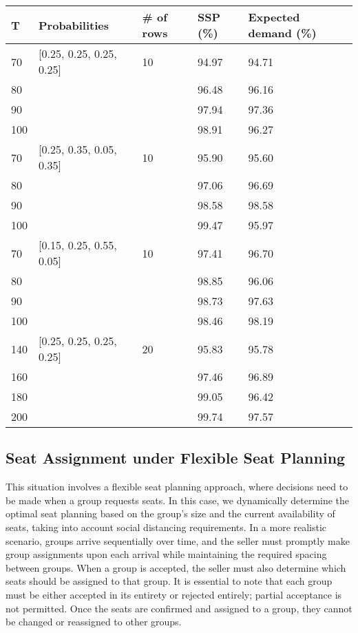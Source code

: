 \begin{table}[ht]
  \centering
  \begin{tabular}{|l|l|l|l|l|}
  \hline
   T & Probabilities & \# of rows & SSP (\%) & Expected demand (\%) \\
  \hline
  70  & [0.25, 0.25, 0.25, 0.25]  & 10 & 94.97 & 94.71  \\
  80  &   &  & 96.48 & 96.16  \\
  90  &   &  & 97.94 & 97.36  \\
  100  &   &  & 98.91 & 96.27  \\
  \hline
  70  & [0.25, 0.35, 0.05, 0.35]  & 10 & 95.90 & 95.60 \\
  80  &   &  & 97.06 & 96.69 \\
  90  &   &  & 98.58 & 98.58 \\
  100  &   &  & 99.47 & 95.97 \\
  \hline
  70  & [0.15, 0.25, 0.55, 0.05]  & 10 & 97.41 & 96.70 \\
  80  &   &  & 98.85 & 96.06 \\
  90  &   &  & 98.73 & 97.63 \\
  100  &   &  & 98.46 & 98.19 \\
  \hline
  140  & [0.25, 0.25, 0.25, 0.25]  & 20 & 95.83 & 95.78 \\
  160  &   &  & 97.46 & 96.89 \\
  180  &   &  & 99.05 & 96.42 \\
  200  &   &  & 99.74 & 97.57 \\
  \hline
  \end{tabular}
\end{table}

\subsection{Seat Assignment under Flexible Seat Planning}\label{sec_dynamic_seat}
This situation involves a flexible seat planning approach, where decisions need to be made when a group requests seats. In this case, we dynamically determine the optimal seat planning based on the group's size and the current availability of seats, taking into account social distancing requirements. In a more realistic scenario, groups arrive sequentially over time, and the seller must promptly make group assignments upon each arrival while maintaining the required spacing between groups. When a group is accepted, the seller must also determine which seats should be assigned to that group. It is essential to note that each group must be either accepted in its entirety or rejected entirely; partial acceptance is not permitted. Once the seats are confirmed and assigned to a group, they cannot be changed or reassigned to other groups.


